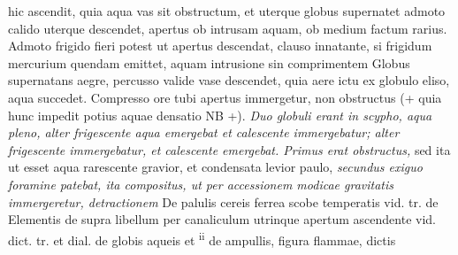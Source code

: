 hic  ascendit, quia aqua  vas sit obstructum, et uterque globus supernatet admoto calido uterque descendet, apertus ob intrusam
aquam,  ob medium factum rarius. Admoto frigido fieri potest ut apertus descendat, clauso innatante, si frigidum mercurium\protect{} quendam emittet, aquam intrusione sin comprimentem Globus supernatans aegre, percusso valide vase descendet, quia aere ictu\protect{} ex globulo eliso, aqua succedet. Compresso ore tubi apertus immergetur, non obstructus (+ quia hunc impedit potius aquae densatio NB +). 
\textit{Duo globuli erant in scypho, aqua pleno, alter frigescente aqua emergebat et calescente immergebatur; alter frigescente immergebatur, et calescente emergebat. Primus erat obstructus,} sed ita ut esset aqua rarescente gravior, et condensata levior paulo,
\textit{secundus exiguo foramine patebat, ita compositus, ut per accessionem modicae gravitatis\protect{} immergeretur, detractionem }
\pend
\count{}
\count{}
\pstart
De palulis cereis ferrea scobe temperatis vid. tr. de Elementis de 
 supra libellum per canaliculum utrinque apertum ascendente vid. dict. tr. et dial. de globis aqueis et \mercury\textsuperscript{ii} de ampullis, figura flammae\protect{}, dictis 
